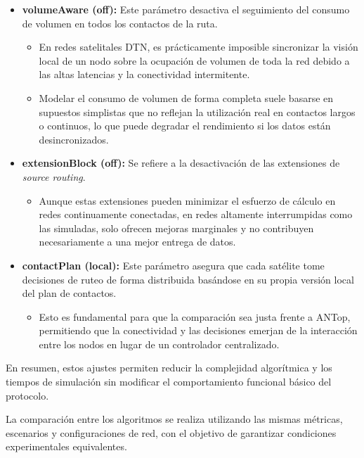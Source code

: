 \begin{itemize}
    \item \textbf{volumeAware (off):}
    Este parámetro desactiva el seguimiento del consumo de volumen en todos los contactos de la ruta.
    \begin{itemize}
        \item En redes satelitales DTN, es prácticamente imposible sincronizar la visión local de un nodo sobre la ocupación de volumen de toda la red debido a las altas latencias y la conectividad intermitente.
        \item Modelar el consumo de volumen de forma completa suele basarse en supuestos simplistas que no reflejan la utilización real en contactos largos o continuos, lo que puede degradar el rendimiento si los datos están desincronizados.
    \end{itemize}

    \item \textbf{extensionBlock (off):}
    Se refiere a la desactivación de las extensiones de \textit{source routing}.
    \begin{itemize}
        \item Aunque estas extensiones pueden minimizar el esfuerzo de cálculo en redes continuamente conectadas, en redes altamente interrumpidas como las simuladas, solo ofrecen mejoras marginales y no contribuyen necesariamente a una mejor entrega de datos.
    \end{itemize}

    \item \textbf{contactPlan (local):}
    Este parámetro asegura que cada satélite tome decisiones de ruteo de forma distribuida basándose en su propia versión local del plan de contactos.
    \begin{itemize}
        \item Esto es fundamental para que la comparación sea justa frente a ANTop, permitiendo que la conectividad y las decisiones emerjan de la interacción entre los nodos en lugar de un controlador centralizado.
    \end{itemize}
\end{itemize}

En resumen, estos ajustes permiten reducir la complejidad algorítmica y los tiempos de simulación sin modificar el comportamiento funcional básico del protocolo.

La comparación entre los algoritmos se realiza utilizando las mismas métricas, escenarios y configuraciones de red, con el objetivo de garantizar condiciones experimentales equivalentes.

